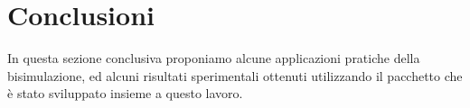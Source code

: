 \documentclass[11pt]{article}
\theoremstyle{definition}
\theoremstyle{plain}
\begin{document}
\renewcommand\contentsname{Indice}
\tableofcontents
{}


\clearpage

\clearpage

\section{Conclusioni}
In questa sezione conclusiva proponiamo alcune applicazioni pratiche della bisimulazione, ed alcuni risultati sperimentali ottenuti utilizzando il pacchetto che è stato sviluppato insieme a questo lavoro.



\newpage

\renewcommand\refname{Bibliografia}


\end{document}
